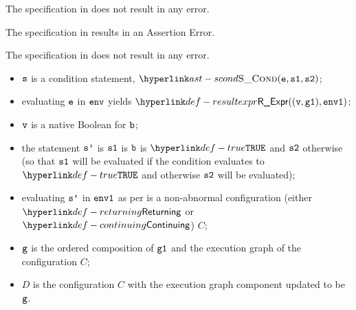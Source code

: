 The specification in 
does not result in any error.

The specification in 
results in an Assertion Error.

The specification in  does not result in any error.

\ProseParagraph
\AllApply
\begin{itemize}
\item $\vs$ is a condition statement, $\SCond(\ve, \vsone, \vstwo)$;
\item evaluating $\ve$ in $\env$ yields $\ResultExpr((\vv, \vgone), \envone)$\ProseOrAbnormal;
\item $\vv$ is a native Boolean for $\vb$;
\item the statement $\vsp$ is $\vsone$ is $\vb$ is $\True$ and $\vstwo$ otherwise
      (so that $\vsone$ will be evaluated if the condition evaluates to $\True$ and otherwise
      $\vstwo$ will be evaluated);
\item evaluating $\vsp$ in $\envone$ as per  is a non-abnormal configuration
      (either $\Returning$ or $\Continuing$) $C$\ProseOrAbnormal;
\item $\vg$ is the ordered composition of $\vgone$ and the execution graph of the configuration $C$;
\item $D$ is the configuration $C$ with the execution graph component updated to be $\vg$.
\end{itemize}

\FormallyParagraph
\begin{mathpar}
\end{mathpar}

